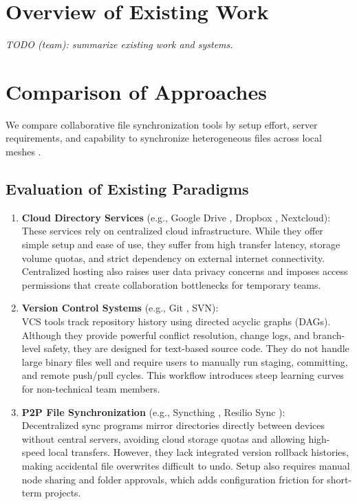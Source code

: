 \documentclass[11pt,oneside]{article}
\begin{document}
\section{Overview of Existing Work}
\textit{TODO (team): summarize existing work and systems.}

\section{Comparison of Approaches}
We compare collaborative file synchronization tools by setup effort, server requirements, and capability to synchronize heterogeneous files across local meshes \cite{googledrive,dropbox,gitbook,github,syncthing,resilio}.

\subsection{Evaluation of Existing Paradigms}
\begin{enumerate}
    \item \textbf{Cloud Directory Services} (e.g., Google Drive \cite{googledrive}, Dropbox \cite{dropbox}, Nextcloud): \\
    These services rely on centralized cloud infrastructure. While they offer simple setup and ease of use, they suffer from high transfer latency, storage volume quotas, and strict dependency on external internet connectivity. Centralized hosting also raises user data privacy concerns and imposes access permissions that create collaboration bottlenecks for temporary teams.
    
    \item \textbf{Version Control Systems} (e.g., Git \cite{gitbook, github}, SVN): \\
    VCS tools track repository history using directed acyclic graphs (DAGs). Although they provide powerful conflict resolution, change logs, and branch-level safety, they are designed for text-based source code. They do not handle large binary files well and require users to manually run staging, committing, and remote push/pull cycles. This workflow introduces steep learning curves for non-technical team members.
    
    \item \textbf{P2P File Synchronization} (e.g., Syncthing \cite{syncthing}, Resilio Sync \cite{resilio}): \\
    Decentralized sync programs mirror directories directly between devices without central servers, avoiding cloud storage quotas and allowing high-speed local transfers. However, they lack integrated version rollback histories, making accidental file overwrites difficult to undo. Setup also requires manual node sharing and folder approvals, which adds configuration friction for short-term projects.
\end{enumerate}
\end{document}
